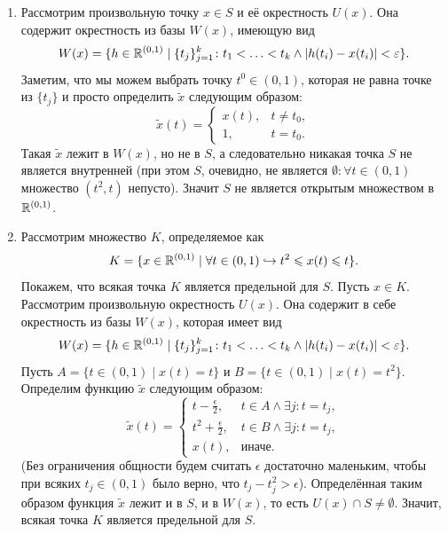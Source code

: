 \begin{solve}
    \begin{enumerate}
        \item Рассмотрим произвольную точку $x \in S$ и её окрестность $U(x)$. Она содержит окрестность из базы $W(x)$, имеющую вид
        \[
            W(x) = \{h \in \mathbb{R}^{(0, 1)} \mid \{t_j\}_{j = 1}^k\colon t_1 < \ldots < t_k \wedge |h(t_i) - x(t_i)| < \varepsilon\}.
        \]
        Заметим, что мы можем выбрать точку $t^0 \in (0, 1)$, которая не равна точке из $\{t_{j}\}$ и просто определить $\tilde{x}$ следующим образом:
        \[
            \tilde{x}(t) = \begin{cases}
                               x(t), & t \neq t_0, \\
                               1, & t = t_0.
            \end{cases}
        \]
        Такая $\tilde{x}$ лежит в $W(x)$, но не в $S$, а следовательно никакая точка $S$ не является внутренней (при этом $S$, очевидно, не является $\emptyset\colon \forall t \in (0, 1)$ множество $(t^2, t)$ непусто). Значит $S$ не является открытым множеством в $\mathbb{R}^{(0, 1)}$.
        \item Рассмотрим множество $K$, определяемое как
        \[
            K = \{x \in \mathbb{R}^{(0, 1)} \mid \forall t \in (0, 1) \hookrightarrow t^2 \leqslant x(t) \leqslant t\}.
        \]
        Покажем, что всякая точка $K$ является предельной для $S$. Пусть $x \in K$. Рассмотрим произвольную окрестность $U(x)$. Она содержит в себе окрестность из базы $W(x)$, которая имеет вид
        \[
            W(x) = \{h \in \mathbb{R}^{(0, 1)} \mid \{t_j\}_{j = 1}^k\colon t_1 < \ldots < t_k \wedge |h(t_i) - x(t_i)| < \varepsilon\}.
        \]
        Пусть $A = \{t \in (0, 1) \mid x(t) = t\}$ и $B = \{t \in (0, 1) \mid x(t) = t^2\}$. Определим функцию $\tilde{x}$ следующим образом:
        \[
            \tilde{x}(t) = \begin{cases}
                               t - \frac{\epsilon}{2}, & t \in A \wedge \exists j\colon t = t_j, \\
                               t^2 + \frac{\epsilon}{2}, & t \in B \wedge \exists j\colon t = t_j, \\
                               x(t), & \text{иначе}.
            \end{cases}
        \]
        (Без ограничения общности будем считать $\epsilon$ достаточно маленьким, чтобы при всяких $t_j \in (0, 1)$ было верно, что $t_j - t_j^2 > \epsilon$). Определённая таким образом функция $\tilde{x}$ лежит и в $S$, и в $W(x)$, то есть $U(x) \cap S \neq \emptyset$. Значит, всякая точка $K$ является предельной для $S$. \\

\end{enumerate}
\end{solve}
